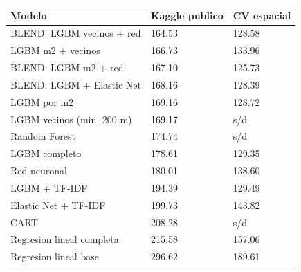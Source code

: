 
\begin{tabular}{lll}
\toprule
Modelo & Kaggle publico & CV espacial\\
\midrule
BLEND: LGBM vecinos + red & 164.53 & 128.58\\
LGBM m2 + vecinos & 166.73 & 133.96\\
BLEND: LGBM m2 + red & 167.10 & 125.73\\
BLEND: LGBM + Elastic Net & 168.16 & 128.39\\
LGBM por m2 & 169.16 & 128.72\\
\addlinespace
LGBM vecinos (min. 200 m) & 169.17 & s/d\\
Random Forest & 174.74 & s/d\\
LGBM completo & 178.61 & 129.35\\
Red neuronal & 180.01 & 138.60\\
LGBM + TF-IDF & 194.39 & 129.49\\
\addlinespace
Elastic Net + TF-IDF & 199.73 & 143.82\\
CART & 208.28 & s/d\\
Regresion lineal completa & 215.58 & 157.06\\
Regresion lineal base & 296.62 & 189.61\\
\bottomrule
\end{tabular}
